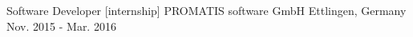 \begin{cventries}
\cventry
{Software Developer [internship]} %
{PROMATIS software GmbH} %
{Ettlingen, Germany} %
{Nov. 2015 - Mar. 2016} %
{
}



\end{cventries}
